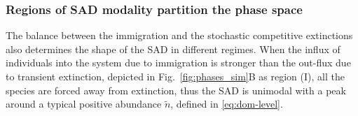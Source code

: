 \documentclass[9pt,twocolumn,twoside,lineno]{pnas-new}
\begin{document}
\subsubsection{Regions of SAD modality partition the phase space}
%
%
The balance between the immigration and the stochastic competitive extinctions also determines the shape of the SAD in different regimes. 
When the influx of individuals into the system due to immigration is stronger than the out-flux due to transient extinction, depicted in Fig.~\ref{fig:phases_sim}B as region (I), all the species are forced away from extinction, thus the SAD is unimodal with a peak around a typical positive abundance $\tilde{n}$, defined in \eqref{eq:dom-level}.
\end{document}
